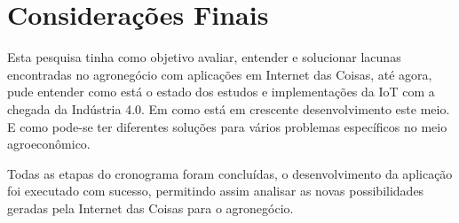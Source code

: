 \documentclass[eso]{bcc}
\begin{document}
\chapter{Considerações Finais}\label{chap:consideracoes}

Esta pesquisa tinha como objetivo avaliar, entender e solucionar lacunas encontradas 
no agronegócio com aplicações em Internet das Coisas, até agora, pude entender como está 
o estado dos estudos e implementações da IoT com a chegada da Indústria 4.0. Em como está 
em crescente desenvolvimento este meio. E como pode-se ter diferentes soluções para vários 
problemas específicos no meio agroeconômico.

Todas as etapas do cronograma foram concluídas, o desenvolvimento da aplicação foi executado 
com sucesso, permitindo assim analisar as novas possibilidades geradas pela Internet das Coisas 
para o agronegócio.


\nocite{*} %



\end{document}

